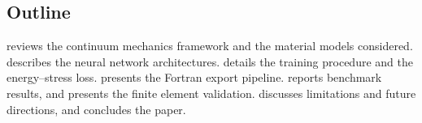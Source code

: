 \subsection{Outline}

 reviews the continuum mechanics framework and the
material models considered.   describes the neural
network architectures.   details the training procedure and
the energy--stress loss.   presents the Fortran
export pipeline.   reports benchmark results, and
 presents the finite element validation.
 discusses limitations and future directions, and
 concludes the paper.
